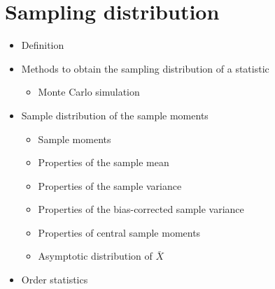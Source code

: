 \section{Sampling distribution}
\begin{itemize}
    \item Definition
    \item Methods to obtain the sampling distribution of a statistic
        \begin{itemize}
            \item Monte Carlo simulation
        \end{itemize}
    \item Sample distribution of the sample moments
        \begin{itemize}
            \item Sample moments
            \item Properties of the sample mean
            \item Properties of the sample variance
            \item Properties of the bias-corrected sample variance
            \item Properties of central sample moments
            \item Asymptotic distribution of $\bar{X}$
        \end{itemize}
    \item Order statistics
\end{itemize}